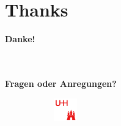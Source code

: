 
\section*{Thanks}
\begin{frame}
    
    \centering
    \vspace{2cm}
    
    \textbf{\Huge Danke!}
 
    \ \\
    \ \\
    \textbf{Fragen oder Anregungen?}
    
    
    \vspace{1.5cm}
    \begin{figure}
        \centering
        \begin{subfigure}{0.2\textwidth}
            \centering
            \includegraphics[height=1cm]{assets/logo/red.pdf}
        \end{subfigure}%
    \end{figure}
\end{frame}